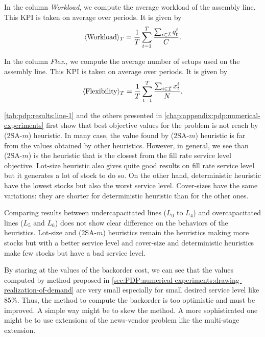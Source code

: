 In the column \emph{Workload}, we compute the average workload of the assembly line.
This KPI is taken on average over periods.
It is given by
\begin{equation}
  \left<\mbox{Workload}\right>_{\horizon} = \frac{1}{\horizon} \sum_{t=1}^{\horizon} \frac{\sum_{i\in\REF} \quantity_t^i}{\capacity}.
\end{equation}


In the column \emph{Flex.}, we compute the average number of setups used on the assembly line.
This KPI is taken on average over periods.
It is given by
\begin{equation}
  \left<\mbox{Flexibility}\right>_{\horizon} = \frac{1}{\horizon} \sum_{t=1}^{\horizon} \frac{\sum_{i\in\REF} \setup_t^i}{\nbsetups}.
\end{equation}






\cref{tab:pdp:results:line-1} and the others presented in \cref{chap:appendix:pdp:numerical-experiments} first show that best objective values for the problem is not reach by (2SA-$m$) heuristic.
In many case, the value found by (2SA-$m$) heuristic is far from the values obtained by other heuristics.
However, in general, we see than (2SA-$m$) is the heuristic that is the closest from the fill rate service level objective.
Lot-size heuristic also gives quite good results on fill rate service level but it generates a lot of stock to do so.
On the other hand, deterministic heuristic have the lowest stocks but also the worst service level.
Cover-sizes have the same variations: they are shorter for deterministic heuristic than for the other ones.


Comparing results between undercapacitated lines ($L_0$ to $L_4$) and overcapacitated lines ($L_5$ and $L_6$) does not show clear difference on the behaviors of the heuristics.
Lot-size and (2SA-$m$) heuristics remain the heuristics making more stocks but with a better service level and cover-size and deterministic heuristics make few stocks but have a bad service level.


By staring at the values of the backorder cost, we can see that the values computed by method proposed in \cref{sec:PDP:numerical-experiments:drawing-realization-of-demand} are very small especially for small desired service level like 85\%.
Thus, the method to compute the backorder is too optimistic and must be improved.
A simple way might be to skew the method.
A more sophisticated one might be to use extensions of the news-vendor problem like the multi-stage extension.



